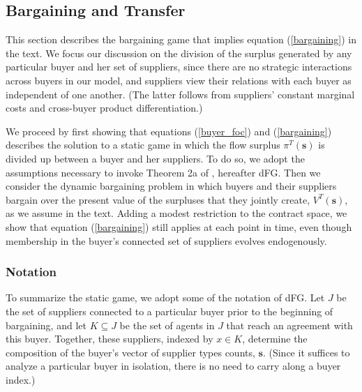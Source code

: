 \documentclass[12pt]{article} \usepackage{amsmath,amssymb,amsthm,geometry,graphicx,setspace,algorithm,algpseudocode,float}
\begin{document}
\subsection{Bargaining and Transfer}
\label{app:bargaining}
This section describes the bargaining game that implies equation (\ref{bargaining}) in the text. We focus our discussion on the division of the surplus generated by any particular buyer and her set of suppliers, since there are no strategic interactions across buyers in our model, and suppliers view their relations with each buyer as independent of one another. (The latter follows from suppliers' constant marginal costs and cross-buyer product differentiation.)

We proceed by first showing that equations (\ref{buyer_foc}) and (\ref{bargaining}) describes the solution to a static game in which the flow surplus $\pi^T(\mathbf{s})$ is divided up between a buyer and her suppliers. To do so, we adopt the assumptions necessary to invoke Theorem 2a of \cite{deFontenayGans}, hereafter dFG. Then we consider the dynamic bargaining problem in which buyers and their suppliers bargain over the present value of the surpluses that they jointly create, $V^T(\mathbf{s})$, as we assume in the text. Adding a modest restriction to the contract space, we show that equation (\ref{bargaining}) still applies at each point in time, even though membership in the buyer's connected set of suppliers evolves endogenously. 


\subsubsection{Notation}
\label{sec:notation}
To summarize the static game, we adopt some of the notation of dFG. Let $J$ be the set of suppliers connected to a particular buyer prior to the beginning of bargaining, and let $K\subseteq J$ be the set of agents in $J$ that reach an agreement with this buyer. Together, these suppliers, indexed by $x \in K$, determine the composition of the buyer's vector of supplier types counts, $\mathbf{s}.$ (Since it suffices to analyze a particular buyer in isolation, there is no need to carry along a buyer index.)
\end{document}
